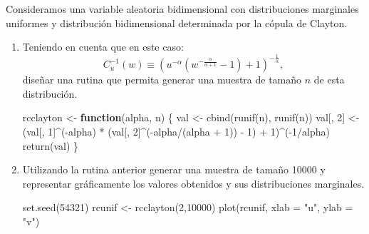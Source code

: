\documentclass[
]{book}
\newenvironment{Shaded}{\begin{snugshade}}{\end{snugshade}}
\newcommand{\AttributeTok}[1]{\textcolor[rgb]{0.77,0.63,0.00}{#1}}
\newcommand{\ControlFlowTok}[1]{\textcolor[rgb]{0.13,0.29,0.53}{\textbf{#1}}}
\newcommand{\DecValTok}[1]{\textcolor[rgb]{0.00,0.00,0.81}{#1}}
\newcommand{\FunctionTok}[1]{\textcolor[rgb]{0.00,0.00,0.00}{#1}}
\newcommand{\NormalTok}[1]{#1}
\newcommand{\OtherTok}[1]{\textcolor[rgb]{0.56,0.35,0.01}{#1}}
\newcommand{\SpecialCharTok}[1]{\textcolor[rgb]{0.00,0.00,0.00}{#1}}
\newcommand{\StringTok}[1]{\textcolor[rgb]{0.31,0.60,0.02}{#1}}
\theoremstyle{break}
\theoremstyle{definition}
\theoremstyle{definition}
\theoremstyle{definition}
\theoremstyle{definition}
\theoremstyle{remark}
\begin{document}
Consideramos una variable aleatoria bidimensional con distribuciones marginales uniformes y distribución bidimensional determinada por la cópula de Clayton.

\begin{enumerate}
\def\labelenumi{\alph{enumi})}
\item
  Teniendo en cuenta que en este caso:
  \[C_{u}^{-1}(w)\equiv\left(  u^{-\alpha}\left(  
  w^{-\frac{\alpha}{\alpha+1}}-1\right) + 1 \right)^{-\frac{1}{\alpha}},\]
  diseñar una rutina que permita generar una muestra de tamaño \(n\)
  de esta distribución.

\begin{Shaded}
\begin{Highlighting}[]
\NormalTok{rcclayton }\OtherTok{\textless{}{-}} \ControlFlowTok{function}\NormalTok{(alpha, n) \{}
\NormalTok{  val }\OtherTok{\textless{}{-}} \FunctionTok{cbind}\NormalTok{(}\FunctionTok{runif}\NormalTok{(n), }\FunctionTok{runif}\NormalTok{(n))}
\NormalTok{  val[, }\DecValTok{2}\NormalTok{] }\OtherTok{\textless{}{-}}\NormalTok{ (val[, }\DecValTok{1}\NormalTok{]}\SpecialCharTok{\^{}}\NormalTok{(}\SpecialCharTok{{-}}\NormalTok{alpha) }\SpecialCharTok{*} 
\NormalTok{              (val[, }\DecValTok{2}\NormalTok{]}\SpecialCharTok{\^{}}\NormalTok{(}\SpecialCharTok{{-}}\NormalTok{alpha}\SpecialCharTok{/}\NormalTok{(alpha }\SpecialCharTok{+} \DecValTok{1}\NormalTok{)) }\SpecialCharTok{{-}} \DecValTok{1}\NormalTok{) }\SpecialCharTok{+} \DecValTok{1}\NormalTok{)}\SpecialCharTok{\^{}}\NormalTok{(}\SpecialCharTok{{-}}\DecValTok{1}\SpecialCharTok{/}\NormalTok{alpha)}
  \FunctionTok{return}\NormalTok{(val)}
\NormalTok{\}}
\end{Highlighting}
\end{Shaded}
\item
  Utilizando la rutina anterior generar una muestra de tamaño
  10000 y representar gráficamente los valores obtenidos y sus
  distribuciones marginales.

\begin{Shaded}
\begin{Highlighting}[]
\FunctionTok{set.seed}\NormalTok{(}\DecValTok{54321}\NormalTok{)}
\NormalTok{rcunif }\OtherTok{\textless{}{-}} \FunctionTok{rcclayton}\NormalTok{(}\DecValTok{2}\NormalTok{,}\DecValTok{10000}\NormalTok{)}
\FunctionTok{plot}\NormalTok{(rcunif, }\AttributeTok{xlab =} \StringTok{"u"}\NormalTok{, }\AttributeTok{ylab =} \StringTok{"v"}\NormalTok{)}
\end{Highlighting}
\end{Shaded}


\end{enumerate}
\end{document}
